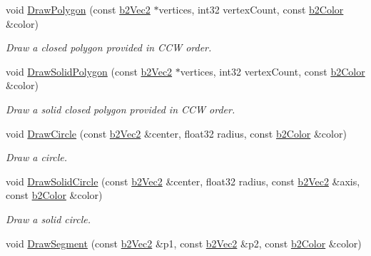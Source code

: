 \begin{DoxyCompactItemize}
\item 
\hypertarget{class_debug_draw_a14ab8cf80799e57df5414db216552962}{void \hyperlink{class_debug_draw_a14ab8cf80799e57df5414db216552962}{Draw\-Polygon} (const \hyperlink{structb2_vec2}{b2\-Vec2} $\ast$vertices, int32 vertex\-Count, const \hyperlink{structb2_color}{b2\-Color} \&color)}\label{class_debug_draw_a14ab8cf80799e57df5414db216552962}

\begin{DoxyCompactList}\small\item\em Draw a closed polygon provided in C\-C\-W order. \end{DoxyCompactList}\item 
\hypertarget{class_debug_draw_a1562ce91df605efef3cdf300be267cc2}{void \hyperlink{class_debug_draw_a1562ce91df605efef3cdf300be267cc2}{Draw\-Solid\-Polygon} (const \hyperlink{structb2_vec2}{b2\-Vec2} $\ast$vertices, int32 vertex\-Count, const \hyperlink{structb2_color}{b2\-Color} \&color)}\label{class_debug_draw_a1562ce91df605efef3cdf300be267cc2}

\begin{DoxyCompactList}\small\item\em Draw a solid closed polygon provided in C\-C\-W order. \end{DoxyCompactList}\item 
\hypertarget{class_debug_draw_a5adb064981a67fefe7064820006b673e}{void \hyperlink{class_debug_draw_a5adb064981a67fefe7064820006b673e}{Draw\-Circle} (const \hyperlink{structb2_vec2}{b2\-Vec2} \&center, float32 radius, const \hyperlink{structb2_color}{b2\-Color} \&color)}\label{class_debug_draw_a5adb064981a67fefe7064820006b673e}

\begin{DoxyCompactList}\small\item\em Draw a circle. \end{DoxyCompactList}\item 
\hypertarget{class_debug_draw_a82428519034f36a01941dd19d6108bee}{void \hyperlink{class_debug_draw_a82428519034f36a01941dd19d6108bee}{Draw\-Solid\-Circle} (const \hyperlink{structb2_vec2}{b2\-Vec2} \&center, float32 radius, const \hyperlink{structb2_vec2}{b2\-Vec2} \&axis, const \hyperlink{structb2_color}{b2\-Color} \&color)}\label{class_debug_draw_a82428519034f36a01941dd19d6108bee}

\begin{DoxyCompactList}\small\item\em Draw a solid circle. \end{DoxyCompactList}\item 
\hypertarget{class_debug_draw_a69927caae41d26f23dea336a1269ee4e}{void \hyperlink{class_debug_draw_a69927caae41d26f23dea336a1269ee4e}{Draw\-Segment} (const \hyperlink{structb2_vec2}{b2\-Vec2} \&p1, const \hyperlink{structb2_vec2}{b2\-Vec2} \&p2, const \hyperlink{structb2_color}{b2\-Color} \&color)}\label{class_debug_draw_a69927caae41d26f23dea336a1269ee4e}


\end{DoxyCompactItemize}
